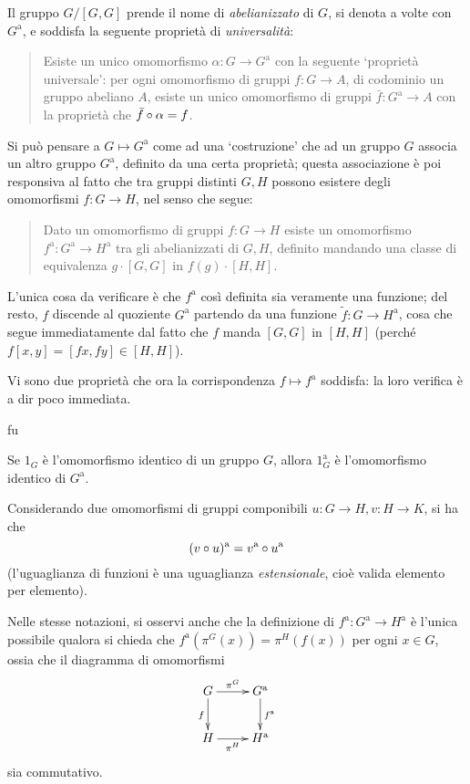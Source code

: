 Il gruppo \(G/[G,G]\) prende il nome di \emph{abelianizzato} di \(G\), si denota a volte con \(G^\text{a}\), e soddisfa la seguente proprietà di \emph{universalità}:
\begin{quote}
	Esiste un unico omomorfismo \(\alpha : G \to G^\text{a}\) con la seguente `proprietà universale': per ogni omomorfismo di gruppi \(f : G \to A\), di codominio un gruppo abeliano \(A\), esiste un unico omomorfismo di gruppi \(\bar f : G^\text{a} \to A\) con la proprietà che \(\bar f \circ \alpha = f\).
\end{quote}
\begin{remark}
	Si può pensare a \(G\mapsto G^\text{a}\) come ad una `costruzione' che ad un gruppo \(G\) associa un altro gruppo \(G^\text{a}\), definito da una certa proprietà; questa associazione è poi responsiva al fatto che tra gruppi distinti \(G,H\) possono esistere degli omomorfismi \(f : G \to H\), nel senso che segue:
	\begin{quote}
		Dato un omomorfismo di gruppi \(f : G \to H\) esiste un omomorfismo \(f^\text{a} : G^\text{a} \to H^\text{a}\) tra gli abelianizzati di \(G,H\), definito mandando una classe di equivalenza \(g\cdot [G,G]\) in \(f(g)\cdot [H,H]\).
	\end{quote}
	L'unica cosa da verificare è che \(f^\text{a}\) così definita sia veramente una funzione; del resto, \(f\) discende al quoziente \(G^\text{a}\) partendo da una funzione \(\tilde f : G\to H^\text{a}\), cosa che segue immediatamente dal fatto che \(f\) manda \([G,G]\) in \([H,H]\) (perché \(f[x,y]=[fx, fy]\in [H,H]\)).
\end{remark}
Vi sono due proprietà che ora la corrispondenza \(f\mapsto f^\text{a}\) soddisfa: la loro verifica è a dir poco immediata.
\begin{enumtag}{fu}
	\item \label{fct_1} Se \(1_G\) è l'omomorfismo identico di un gruppo \(G\), allora \(1_G^\text{a}\) è l'omomorfismo identico di \(G^\text{a}\).
	\item \label{fct_2} Considerando due omomorfismi di gruppi componibili \(u : G\to H, v : H\to K\), si ha che
	\[(v\circ u)^\text{a} = v^\text{a} \circ u^\text{a}\]
	(l'uguaglianza di funzioni è una uguaglianza \emph{estensionale}, cioè valida elemento per elemento).
\end{enumtag}
Nelle stesse notazioni, si osservi anche che la definizione di \(f^\text{a} : G^\text{a} \to H^\text{a}\) è l'unica possibile qualora si chieda che \(f^\text{a}(\pi^G(x)) = \pi^H(f(x))\) per ogni \(x\in G\), ossia che il diagramma di omomorfismi
\[\xymatrix{
	G \ar[r]^-{\pi^G} \ar[d]_f & G^\text{a}\ar[d]^{f^\text{a}} \\
	H \ar[r]_-{\pi^H} & H^\text{a}
	}\]
sia commutativo.

